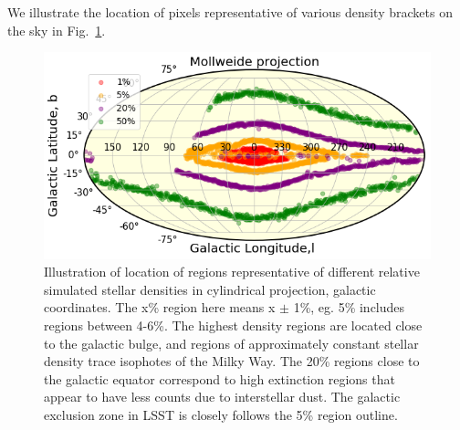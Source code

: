 \documentclass[DM,lsstdraft,toc,usenatbib]{lsstdoc}
\begin{document}
We illustrate the location of pixels representative of various density brackets on the sky in Fig.~\ref{fig:mollw_galactic}. 


\begin{figure}
\includegraphics[width=1.0\columnwidth]{figs/03_density_regions_mollw_galactic.png}
\caption{Illustration of location of regions representative of different relative simulated stellar densities in cylindrical projection, galactic coordinates. The x\% region  here means  x $\pm$ 1\%, eg.  5\% includes regions between 4-6\%. The highest density regions are located close to the galactic bulge, and regions of approximately constant stellar density trace isophotes of the Milky Way. The 20\% regions close to the galactic equator correspond to high extinction regions that appear to have less counts due to interstellar dust. The galactic exclusion zone in LSST is closely follows the 5\% region outline. }
\label{fig:mollw_galactic}
\end{figure} 
\end{document}
